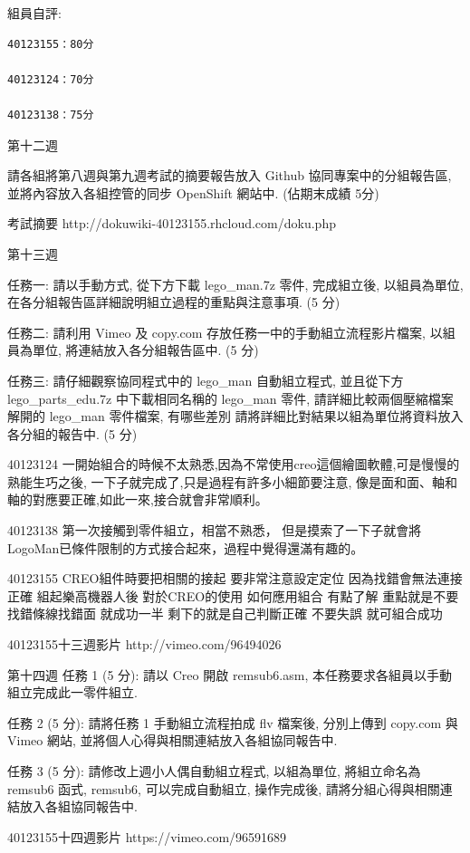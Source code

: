 \documentclass[]{article}
\begin{document}
組員自評:

\begin{verbatim}
40123155：80分

40123124：70分

40123138：75分
\end{verbatim}

第十二週

請各組將第八週與第九週考試的摘要報告放入 Github 協同專案中的分組報告區,
並將內容放入各組控管的同步 OpenShift 網站中. (佔期末成績 5分)

考試摘要 http://dokuwiki-40123155.rhcloud.com/doku.php

第十三週

任務一: 請以手動方式, 從下方下載 lego\_man.7z 零件, 完成組立後,
以組員為單位, 在各分組報告區詳細說明組立過程的重點與注意事項. (5 分)

任務二: 請利用 Vimeo 及 copy.com 存放任務一中的手動組立流程影片檔案,
以組員為單位, 將連結放入各分組報告區中. (5 分)

任務三: 請仔細觀察協同程式中的 lego\_man 自動組立程式, 並且從下方
lego\_parts\_edu.7z 中下載相同名稱的 lego\_man 零件,
請詳細比較兩個壓縮檔案解開的 lego\_man 零件檔案, 有哪些差別
請將詳細比對結果以組為單位將資料放入各分組的報告中. (5 分)

40123124
一開始組合的時候不太熟悉,因為不常使用creo這個繪圖軟體,可是慢慢的熟能生巧之後,
一下子就完成了,只是過程有許多小細節要注意,
像是面和面、軸和軸的對應要正確,如此一來,接合就會非常順利。

40123138 第一次接觸到零件組立，相當不熟悉，
但是摸索了一下子就會將LogoMan已條件限制的方式接合起來，過程中覺得還滿有趣的。

40123155 CREO組件時要把相關的接起 要非常注意設定定位
因為找錯會無法連接正確 組起樂高機器人後 對於CREO的使用 如何應用組合
有點了解 重點就是不要找錯條線找錯面 就成功一半 剩下的就是自己判斷正確
不要失誤 就可組合成功

40123155十三週影片 http://vimeo.com/96494026

第十四週 任務 1 (5 分): 請以 Creo 開啟 remsub6.asm,
本任務要求各組員以手動組立完成此一零件組立.

任務 2 (5 分): 請將任務 1 手動組立流程拍成 flv 檔案後, 分別上傳到
copy.com 與 Vimeo 網站, 並將個人心得與相關連結放入各組協同報告中.

任務 3 (5 分): 請修改上週小人偶自動組立程式, 以組為單位, 將組立命名為
remsub6 函式, remsub6, 可以完成自動組立, 操作完成後,
請將分組心得與相關連結放入各組協同報告中.

40123155十四週影片 https://vimeo.com/96591689
\end{document}
